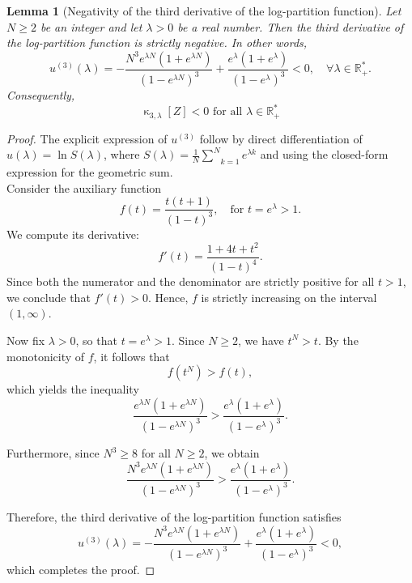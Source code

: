 \documentclass[a4paper, 10pt]{article}
\newcommand{\beq}{\begin{equation}}
\newcommand{\eeq}{\end{equation}}
\newtheorem{lemma}{Lemma}[section]
\theoremstyle{definition}
\begin{document}
\begin{lemma}
[Negativity of the third derivative of the log-partition function]\label{lemma:neg_third_deriv}
Let \( N \geq 2 \) be an integer and let \( \lambda > 0 \) be a real number. Then the third derivative of the log-partition function is strictly negative. In other words,
\beq
u^{(3)}(\lambda) = -\frac{N^3 e^{\lambda N}(1 + e^{\lambda N})}{(1 - e^{\lambda N})^3} + \frac{e^{\lambda}(1 + e^{\lambda})}{(1 - e^{\lambda})^3} < 0, \quad \forall \lambda\in \mathbb{R^*_+}.
\eeq
Consequently,
\beq
\operatorname{\kappa}_{3,\lambda}[Z] < 0 \text{ for all } \lambda \in \mathbb{R}_+^*
\eeq
\end{lemma}
\begin{proof}
The explicit expression  of \( u^{(3)}\) follow by direct differentiation of \( u(\lambda) = \ln S(\lambda) \), where $ S(\lambda) = \frac{1}{N}\underset{k=1}{\overset{N}{\sum}}e^{\lambda k}$ and using the closed-form expression for the geometric sum.\\
Consider the auxiliary function
\[
f(t) = \frac{t(t + 1)}{(1 - t)^3}, \quad \text{for } t = e^{\lambda} > 1.
\]
We compute its derivative:
\[
f'(t) = \frac{1 + 4t + t^2}{(1 - t)^4}.
\]
Since both the numerator and the denominator are strictly positive for all \( t > 1 \), we conclude that \( f'(t) > 0 \). Hence, \( f \) is strictly increasing on the interval \( (1, \infty) \).

Now fix \( \lambda > 0 \), so that \( t = e^{\lambda} > 1 \). Since \( N \geq 2 \), we have \( t^N > t \). By the monotonicity of \( f \), it follows that
\[
f(t^N) > f(t),
\]
which yields the inequality
\[
\frac{e^{\lambda N}(1 + e^{\lambda N})}{(1 - e^{\lambda N})^3} > \frac{e^{\lambda}(1 + e^{\lambda})}{(1 - e^{\lambda})^3}.
\]

Furthermore, since \( N^3 \geq 8 \) for all \( N \geq 2 \), we obtain
\[
\frac{N^3 e^{\lambda N}(1 + e^{\lambda N})}{(1 - e^{\lambda N})^3} > \frac{e^{\lambda}(1 + e^{\lambda})}{(1 - e^{\lambda})^3}.
\]

Therefore, the third derivative of the log-partition function satisfies
\[
u^{(3)}(\lambda) 
= - \frac{N^3 e^{\lambda N}(1 + e^{\lambda N})}{(1 - e^{\lambda N})^3}
+ \frac{e^{\lambda}(1 + e^{\lambda})}{(1 - e^{\lambda})^3}
< 0,
\]
which completes the proof.
\end{proof}
\end{document}
